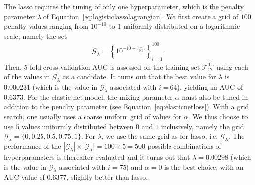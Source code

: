\documentclass{article}
\begin{document}
The lasso requires the tuning of only one hyperparameter, which is the penalty parameter $\lambda$ of Equation~\ref{eq:logisticlassolagrangian}. We first create a grid of $100$ penalty values ranging from $10^{-10}$ to $1$ uniformly distributed on a logarithmic scale, namely the set
\begin{align*}
    \mathcal{G}_\lambda = \left\{10^{-10 + \frac{i - 1}{9.9}}\right\}_{i = 1}^{100}.
\end{align*}
Then, $5$-fold cross-validation AUC is assessed on the training set $\mathcal{T}_{12}^\text{TL}$ using each of the values in $\mathcal{G}_\lambda$ as a candidate. It turns out that the best value for $\lambda$ is $0.000231$ (which is the value in $\mathcal{G}_\lambda$ associated with $i = 64$), yielding an AUC of $0.6373$. For the elastic-net model, the mixing parameter $\alpha$ must also be tuned in addition to the penalty parameter (see Equation~\ref{eq:elasticnetloss}). With a grid search, one usually uses a coarse uniform grid of values for $\alpha$. We thus choose to use $5$ values uniformly distributed between $0$ and $1$ inclusively, namely the grid $\mathcal{G}_\alpha = \{0, 0.25, 0.5, 0.75, 1\}$. For $\lambda$, we use the same grid as for lasso, i.e. $\mathcal{G}_\lambda$. The performance of the $|\mathcal{G}_\lambda| \times |\mathcal{G}_\alpha| = 100 \times 5 = 500$ possible combinations of hyperparameters is thereafter evaluated and it turns out that $\lambda = 0.00298$ (which is the value in $\mathcal{G}_\lambda$ associated with $i = 75$) and $\alpha = 0$ is the best choice, with an AUC value of $0.6377$, slightly better than lasso. 
\end{document}
